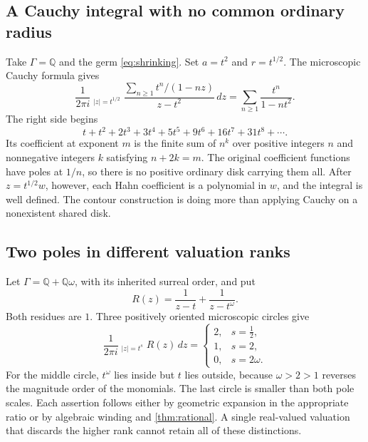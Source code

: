 \documentclass[11pt,letterpaper]{article}
\theoremstyle{definition}
\theoremstyle{remark}
\newcommand{\Q}{\mathbb Q}
\newcommand{\HCoint}{\mathop{\oint^{\!H}}\nolimits}
\numberwithin{equation}{section}
\begin{document}
\subsection{A Cauchy integral with no common ordinary radius}
Take $\Gamma=\Q$ and the germ \eqref{eq:shrinking}. Set $a=t^2$ and $r=t^{1/2}$. The microscopic Cauchy formula gives
\begin{equation}\label{eq:radiusfreeexample}
\frac1{2\pi i}\HCoint_{|z|=t^{1/2}}
 \frac{\displaystyle\sum_{n\ge1}t^n/(1-nz)}{z-t^2}\,dz
=\sum_{n\ge1}\frac{t^n}{1-nt^2}.
\end{equation}
The right side begins
\[
t+t^2+2t^3+3t^4+5t^5+9t^6+16t^7+31t^8+\cdots.
\]
Its coefficient at exponent $m$ is the finite sum of $n^k$ over positive integers $n$ and nonnegative integers $k$ satisfying $n+2k=m$. The original coefficient functions have poles at $1/n$, so there is no positive ordinary disk carrying them all. After $z=t^{1/2}w$, however, each Hahn coefficient is a polynomial in $w$, and the integral is well defined. The contour construction is doing more than applying Cauchy on a nonexistent shared disk.

\subsection{Two poles in different valuation ranks}
Let $\Gamma=\Q+\Q\omega$, with its inherited surreal order, and put
\[
R(z)=\frac1{z-t}+\frac1{z-t^\omega}.
\]
Both residues are $1$. Three positively oriented microscopic circles give
\begin{equation}\label{eq:rankexample}
\frac1{2\pi i}\HCoint_{|z|=t^s}R(z)\,dz
=\begin{cases}
2,&s=\tfrac12,\\
1,&s=2,\\
0,&s=2\omega.
\end{cases}
\end{equation}
For the middle circle, $t^\omega$ lies inside but $t$ lies outside, because $\omega>2>1$ reverses the magnitude order of the monomials. The last circle is smaller than both pole scales. Each assertion follows either by geometric expansion in the appropriate ratio or by algebraic winding and \cref{thm:rational}. A single real-valued valuation that discards the higher rank cannot retain all of these distinctions.
\end{document}
